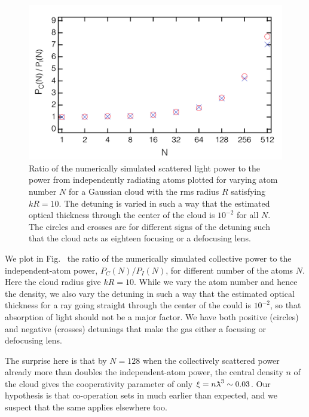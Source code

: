 \begin{figure}[h!]
\begin{center}
\includegraphics[width=\textwidth]{Pc_Pi.pdf}
\end{center}
\caption{Ratio of the numerically simulated scattered light power to the power from independently radiating atoms plotted for varying atom number $N$ for a Gaussian cloud with the rms radius $R$ satisfying $kR=10$. The detuning is varied in such a way that the estimated optical thickness through the center of the cloud is $10^{-2}$ for all $N$. The circles and crosses are for different signs of the detuning such that the cloud acts as eighteen focusing or a defocusing lens.}
\label{PCANDPN}
\end{figure}



We plot in Fig.~ the ratio of the numerically simulated collective power to the independent-atom power, $P_C(N)/P_I(N)$, for different number of the atoms $N$. Here the cloud radius give $kR=10$. While we vary the atom number and hence the density, we also vary the detuning in such a way that the estimated optical thickness for a ray going straight through the center of the could is $10^{-2}$, so that absorption of light should not be a major factor. We have both positive (circles) and negative (crosses) detunings that make the gas either a focusing or defocusing lens.

The surprise here is that by $N=128$ when the collectively scattered power already more than doubles the independent-atom power, the central density $n$ of the cloud gives the cooperativity parameter of only $\xi=n\lambdabar^3\sim 0.03$. Our hypothesis is that co-operation sets in much earlier than expected, and we suspect that the same applies elsewhere too.


